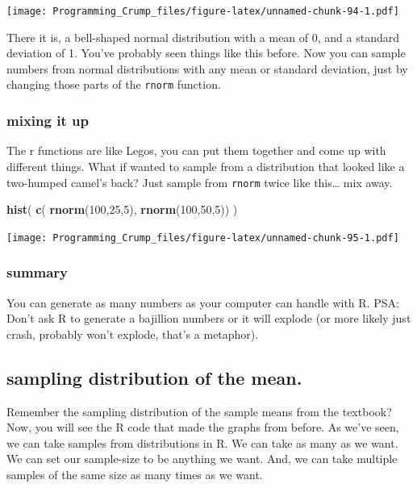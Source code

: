 \documentclass[]{book}
\newenvironment{Shaded}{\begin{snugshade}}{\end{snugshade}}
\newcommand{\KeywordTok}[1]{\textcolor[rgb]{0.13,0.29,0.53}{\textbf{{#1}}}}
\newcommand{\DecValTok}[1]{\textcolor[rgb]{0.00,0.00,0.81}{{#1}}}
\newcommand{\NormalTok}[1]{{#1}}
\theoremstyle{definition}
\theoremstyle{definition}
\theoremstyle{definition}
\theoremstyle{remark}
\begin{document}
\texttt{[image: Programming\_Crump\_files/figure-latex/unnamed-chunk-94-1.pdf]}

There it is, a bell-shaped normal distribution with a mean of 0, and a
standard deviation of 1. You've probably seen things like this before.
Now you can sample numbers from normal distributions with any mean or
standard deviation, just by changing those parts of the \texttt{rnorm}
function.

\subsubsection{mixing it up}\label{mixing-it-up}

The r functions are like Legos, you can put them together and come up
with different things. What if wanted to sample from a distribution that
looked like a two-humped camel's back? Just sample from \texttt{rnorm}
twice like this\ldots{} mix away.

\begin{Shaded}
\begin{Highlighting}[]
\KeywordTok{hist}\NormalTok{( }\KeywordTok{c}\NormalTok{( }\KeywordTok{rnorm}\NormalTok{(}\DecValTok{100}\NormalTok{,}\DecValTok{25}\NormalTok{,}\DecValTok{5}\NormalTok{), }\KeywordTok{rnorm}\NormalTok{(}\DecValTok{100}\NormalTok{,}\DecValTok{50}\NormalTok{,}\DecValTok{5}\NormalTok{)) )}
\end{Highlighting}
\end{Shaded}

\texttt{[image: Programming\_Crump\_files/figure-latex/unnamed-chunk-95-1.pdf]}

\subsubsection{summary}\label{summary}

You can generate as many numbers as your computer can handle with R.
PSA: Don't ask R to generate a bajillion numbers or it will explode (or
more likely just crash, probably won't explode, that's a metaphor).

\subsection{sampling distribution of the
mean.}\label{sampling-distribution-of-the-mean.}

Remember the sampling distribution of the sample means from the
textbook? Now, you will see the R code that made the graphs from before.
As we've seen, we can take samples from distributions in R. We can take
as many as we want. We can set our sample-size to be anything we want.
And, we can take multiple samples of the same size as many times as we
want.
\end{document}
